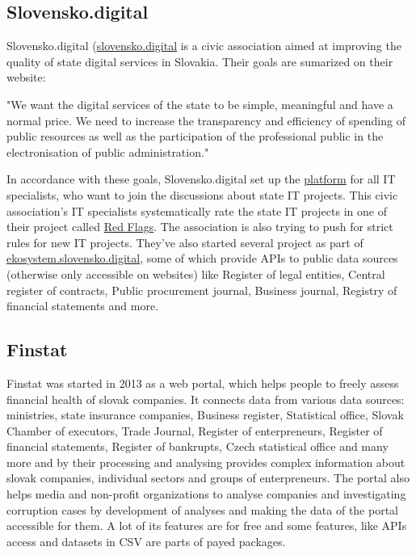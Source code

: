 \documentclass[thesis=B,english]{FITthesis}[2012/06/26]
\begin{document}
	\subsection{Slovensko.digital}
	Slovensko.digital (\href{https://slovensko.digital}{slovensko.digital} is a civic association aimed at improving the quality of state digital services in Slovakia. 
	Their goals are sumarized on their website:
	\begin{displayquote}
		"We want the digital services of the state to be simple, meaningful and have a normal price. We need to increase the transparency and efficiency of spending of public resources as well as the participation of the professional public in the electronisation of public administration."
	\end{displayquote}
	In accordance with these goals, Slovensko.digital set up the \href{https://platforma.slovensko.digital}{platform} for all IT specialists, who want to join the discussions about state IT projects. This civic association's IT specialists systematically rate the state IT projects in one of their project called \href{https://redflags.slovensko.digital/}{Red Flags}. The association is also trying to push for strict rules for new IT projects. They've also started several project as part of \href{https://ekosystem.slovensko.digital/}{ekosystem.slovensko.digital}, some of which provide APIs to public data sources (otherwise only accessible on websites) like Register of legal entities, Central register of contracts, Public procurement journal, Business journal, Registry of financial statements and more.
	\subsection{Finstat}
	Finstat was started in 2013 as a web portal, which helps people to freely assess financial health of slovak companies. It connects data from various data sources: ministries, state insurance companies, Business register, Statistical office, Slovak Chamber of executors, Trade Journal, Register of enterpreneurs, Register of financial statements, Register of bankrupts, Czech statistical office and many more and by their processing and analysing provides complex information about slovak companies, individual sectors and groups of enterpreneurs. The portal also helps media and non-profit organizations to analyse companies and investigating corruption cases by development of analyses and making the data of the portal accessible for them. A lot of its features are for free and some features, like APIs access and datasets in CSV are parts of payed packages.
\end{document}
